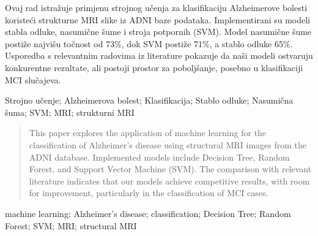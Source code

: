 \documentclass[zavrsnirad]{fer}
\begin{document}

\begin{sazetak}
	Ovaj rad istražuje primjenu strojnog učenja za klasifikaciju Alzheimerove bolesti koristeći strukturne MRI slike iz ADNI baze podataka. Implementirani su modeli stabla odluke, nasumične šume i stroja potpornih (SVM). Model nasumične šume postiže najvišu točnost od 73\%, dok SVM postiže 71\%, a stablo odluke 65\%. Usporedba s relevantnim radovima iz literature pokazuje da naši modeli ostvaruju konkurentne rezultate, ali postoji prostor za poboljšanje, posebno u klasifikaciji MCI slučajeva.
\end{sazetak}

\begin{kljucnerijeci}
	Strojno učenje; Alzheimerova bolest; Klasifikacija; Stablo odluke; Nasumična šuma; SVM; MRI; strukturni MRI
\end{kljucnerijeci}

\begin{abstract}
	This paper explores the application of machine learning for the classification of Alzheimer's disease using structural MRI images from the ADNI database. Implemented models include Decision Tree, Random Forest, and Support Vector Machine (SVM). The comparison with relevant literature indicates that our models achieve competitive results, with room for improvement, particularly in the classification of MCI cases.
\end{abstract}

\begin{keywords}
	machine learning; Alzheimer's disease; classification; Decision Tree; Random Forest; SVM; MRI; structural MRI
\end{keywords}





\backmatter
\end{document}
